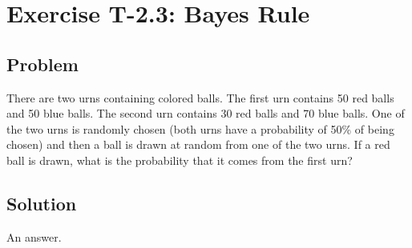 \section*{Exercise T-2.3: Bayes Rule}

\subsection*{Problem}
There are two urns containing colored balls. The first urn contains 50 red balls and 50 blue balls. The second urn contains 30 red balls and 70 blue balls. One of the two urns is randomly chosen (both urns have a probability of 50\% of being chosen) and then a ball is drawn at random from one of the two urns. If a red ball is drawn, what is the probability that it comes from the first urn?


\subsection*{Solution}
An answer.
